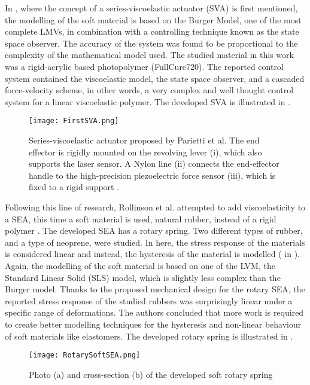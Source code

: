 In \cite{parietti2011series}, where the concept of a series-viscoelastic actuator (SVA) is first mentioned, the modelling of the soft material is based on the Burger Model, one of the most complete LMVs, in combination with a controlling technique known as the state space observer. The accuracy of the system was found to be proportional to the complexity of the mathematical model used. The studied material in this work was a rigid-acrylic based photopolymer (FullCure720). The reported control system contained the viscoelastic model, the state space observer, and a cascaded force-velocity scheme, in other words, a very complex and well thought control system for a linear viscoelastic polymer. The developed SVA is illustrated in . 

\begin{figure}[htb!]
    \centering
    \texttt{[image: FirstSVA.png]}
    \caption{Series-viscoelastic actuator proposed by Parietti et al. The end effector is rigidly mounted on the revolving lever (i), which also supports the laser sensor. A Nylon line (ii) connects the end-effector handle to the high-precision piezoelectric force sensor (iii), which is fixed to a rigid support \cite{parietti2011series}.}
    \label{fig:firstSVA}
\end{figure}

Following this line of research, Rollinson et al. attempted to add viscoelasticity to a SEA, this time a soft material is used, natural rubber, instead of a rigid polymer \cite{rollinson2013design}. The developed SEA has a rotary spring. Two different types of rubber, and a type of neoprene, were studied. In here, the stress response of the materials is considered linear and instead, the hysteresis of the material is modelled ( in ). Again, the modelling of the soft material is based on one of the LVM, the Standard Linear Solid (SLS) model, which is slightly less complex than the Burger model. Thanks to the proposed mechanical design for the rotary SEA, the reported stress response of the studied rubbers was surprisingly linear under a specific range of deformations. The authors concluded that more work is required to create better modelling techniques for the hysteresis and non-linear behaviour of soft materials like elastomers. The developed rotary spring is illustrated in .

\begin{figure}[htb!]
    \centering
    \texttt{[image: RotarySoftSEA.png]}
    \caption{Photo (a) and cross-section (b) of the developed soft rotary spring \cite{rollinson2013design}}
    \label{fig:rotarySoftSEA}
\end{figure}

